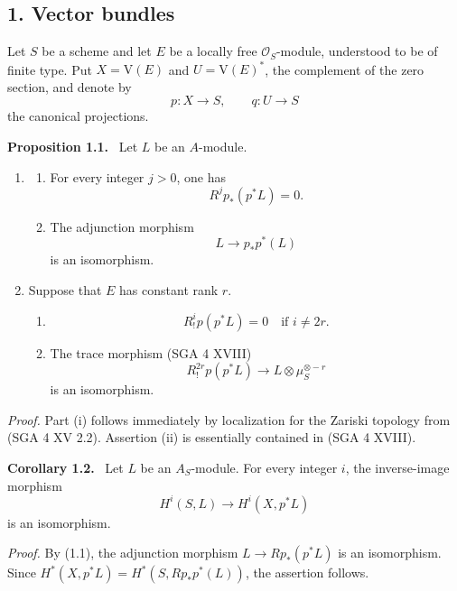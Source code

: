 \documentclass[11pt]{article}
\newenvironment{statement}[1]{\par\medskip\noindent\textbf{#1.}\ }{\par\medskip}
\providecommand{\V}{\mathrm V}
\begin{document}
\subsection*{1. Vector bundles}

Let $S$ be a scheme and let $E$ be a locally free $\mathcal O_S$-module, understood to be of finite type. Put $X=\V(E)$ and $U=\V(E)^*$, the complement of the zero section, and denote by
\[
p:X\to S,
\qquad
q:U\to S
\]
the canonical projections.

\begin{statement}{Proposition 1.1}
Let $L$ be an $A$-module.
\begin{enumerate}[label=(\roman*)]
\item
\begin{enumerate}[label=\alph*)]
\item For every integer $j>0$, one has
\[
R^j p_*(p^*L)=0.
\]
\item The adjunction morphism
\[
L\longrightarrow p_*p^*(L)
\]
is an isomorphism.
\end{enumerate}
\item Suppose that $E$ has constant rank $r$.
\begin{enumerate}[label=\alph*)]
\item
\[
R_!^i p(p^*L)=0\quad\text{if }i\ne 2r.
\]
\item The trace morphism (SGA 4 XVIII)
\[
R_!^{2r}p(p^*L)\longrightarrow L\otimes\mu_S^{\otimes -r}
\]
is an isomorphism.
\end{enumerate}
\end{enumerate}
\end{statement}

\emph{Proof.} Part (i) follows immediately by localization for the Zariski topology from (SGA 4 XV 2.2). Assertion (ii) is essentially contained in (SGA 4 XVIII).

\begin{statement}{Corollary 1.2}
Let $L$ be an $A_S$-module. For every integer $i$, the inverse-image morphism
\[
H^i(S,L)\longrightarrow H^i(X,p^*L)
\]
is an isomorphism.
\end{statement}

\emph{Proof.} By (1.1), the adjunction morphism $L\to Rp_*(p^*L)$ is an isomorphism. Since $H^*(X,p^*L)=H^*(S,Rp_*p^*(L))$, the assertion follows.
\end{document}
